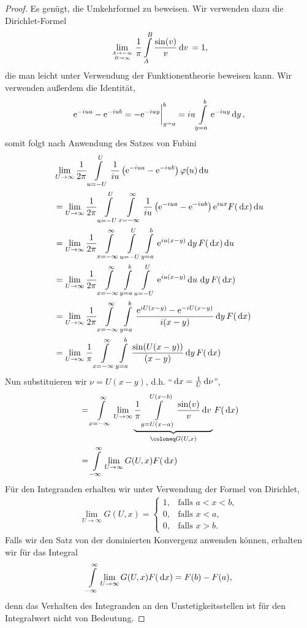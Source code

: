 \begin{proof}
Es genügt, die Umkehrformel zu beweisen. Wir verwenden dazu die Dirichlet-Formel
\begin{align*}
\lim\limits_{\atop{A\to-\infty}{B\to\infty}}\frac{1}{\pi}\int\limits_{A}^B
\frac{\sin(v)}{v}\dv = 1,
\end{align*}
die man leicht unter Verwendung der Funktionentheorie beweisen kann.
Wir verwenden außerdem die Identität,
\begin{align*}
\mathrm{e}^{-iua}-\mathrm{e}^{-iub} = -\mathrm{e}^{-iuy}\bigg|_{y=a}^b
= iu \int\limits_{y=a}^b \mathrm{e}^{-iuy}\,\mathrm{d} y\,,
\end{align*}
somit folgt nach Anwendung des Satzes von Fubini
\begin{align*}
&\lim\limits_{U\to\infty} \frac{1}{2\pi} \int\limits_{u=-U}^U
\frac{1}{iu}\left(\mathrm{e}^{-iua}-\mathrm{e}^{-iub}\right)\varphi(u)\,\mathrm{d} u\,\\
&=\lim\limits_{U\to\infty} \frac{1}{2\pi} \int\limits_{u=-U}^U
\int\limits_{x=-\infty}^\infty
\frac{1}{iu}\left(\mathrm{e}^{-iua}-\mathrm{e}^{-iub}\right)\mathrm{e}^{iux}F(\,\mathrm{d} x) \,\mathrm{d} u\,\\
&=\lim\limits_{U\to\infty} \frac{1}{2\pi} 
\int\limits_{x=-\infty}^\infty
\int\limits_{u=-U}^U
\int\limits_{y=a}^b \mathrm{e}^{iu(x-y)}\,\mathrm{d} y\, F(\,\mathrm{d} x) \,\mathrm{d} u\,\\
&=\lim\limits_{U\to\infty} \frac{1}{2\pi} 
\int\limits_{x=-\infty}^\infty
\int\limits_{y=a}^b
\int\limits_{u=-U}^U
\mathrm{e}^{iu(x-y)}  \,\mathrm{d} u\,\,\mathrm{d} y\, F(\,\mathrm{d} x)\\
&=\lim\limits_{U\to\infty} \frac{1}{2\pi} 
\int\limits_{x=-\infty}^\infty
\int\limits_{y=a}^b
\frac{\mathrm{e}^{iU(x-y)}-\mathrm{e}^{-iU(x-y)}}{i(x-y)}
\,\mathrm{d} y\, F(\,\mathrm{d} x)\\
&=\lim\limits_{U\to\infty} \frac{1}{\pi} 
\int\limits_{x=-\infty}^\infty
\int\limits_{y=a}^b
\frac{\sin(U(x-y))}{(x-y)}
\,\mathrm{d} y\, F(\,\mathrm{d} x)
\end{align*}
Nun substituieren wir $\nu=U(x-y)$, d.h. ``$\,\mathrm{d} x = \frac{1}{U}\,\mathrm{d} \nu$'',
\begin{align*}
&=
\int\limits_{x=-\infty}^\infty
\lim\limits_{U\to\infty}
\underbrace{\frac{1}{\pi}  
\int\limits_{y=U(x-a)}^{U(x-b)}
\frac{\sin(v)}{v}
\dv}_{\defl G(U,x)} F(\dx)\\
&=
\int\limits_{-\infty}^\infty
\lim\limits_{U\to\infty} G(U,x)F(\dx)
\end{align*}
Für den Integranden erhalten wir unter Verwendung der Formel von Dirichlet,
\begin{align*}
\lim\limits_{U\to\infty} G(U,x)=\begin{cases} 1, & \text{falls } a<x<b,\\
0, & \text{falls } x<a,\\
0, & \text{falls } x> b.
\end{cases}
\end{align*}
Falls wir den Satz von der dominierten Konvergenz anwenden können, erhalten wir
für das Integral
\begin{align*}
\int\limits_{-\infty}^\infty \lim\limits_{U\to\infty} G(U,x)F(\,\mathrm{d} x)
= F(b)-F(a),
\end{align*}
denn das Verhalten des Integranden an den Unstetigkeitsstellen ist für den
Integralwert nicht von Bedeutung.


\end{proof}
